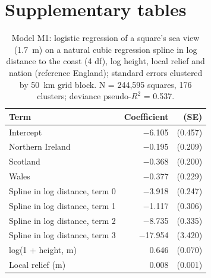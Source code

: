 \documentclass[11pt,a4paper]{article}
\begin{document}
\section{Supplementary tables}
\begin{table}[tbp]\centering\small\caption{Model M1: logistic regression of a square's sea view (1.7~m) on a natural cubic regression spline in log distance to the coast (4 df), log height, local relief and nation (reference England); standard errors clustered by 50~km grid block. N = 244,595 squares, 176 clusters; deviance pseudo-$R^2$ = 0.537.}\label{tab:m1}\begin{tabular}{lrr}\toprule Term & Coefficient & (SE)\\\midrule
Intercept & $-$6.105 & (0.457)\\
Northern Ireland & $-$0.195 & (0.209)\\
Scotland & $-$0.368 & (0.200)\\
Wales & $-$0.377 & (0.229)\\
Spline in log distance, term 0 & $-$3.918 & (0.247)\\
Spline in log distance, term 1 & $-$1.117 & (0.306)\\
Spline in log distance, term 2 & $-$8.735 & (0.335)\\
Spline in log distance, term 3 & $-$17.954 & (3.420)\\
log(1 + height, m) & 0.646 & (0.070)\\
Local relief (m) & 0.008 & (0.001)\\
\bottomrule\end{tabular}\end{table}
\end{document}
